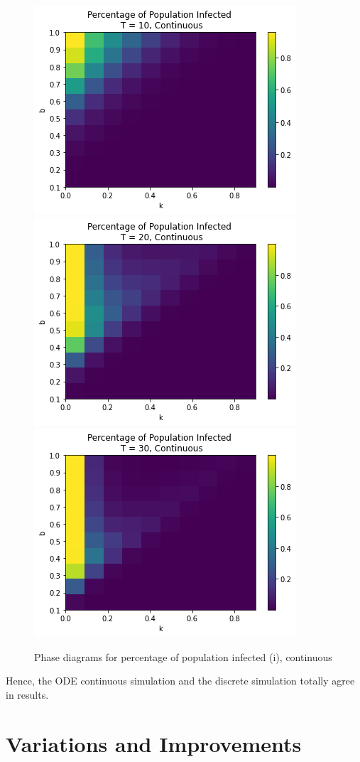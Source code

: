 \documentclass{article}
\begin{document}
\begin{figure}[htp]
\centering
\includegraphics[width=.3\textwidth]{Figure2_ode_infT10_bsmall.png}\hfill
\includegraphics[width=.3\textwidth]{Figure2_ode_infT20_bsmall.png}\hfill
\includegraphics[width=.3\textwidth]{Figure2_ode_infT30_bsmall.png}

\caption{Phase diagrams for percentage of population infected (i), continuous}
\label{fig:figure3}
\end{figure}



Hence, the ODE continuous simulation and the discrete simulation totally agree in results.










\section{Variations and Improvements}
\end{document}
